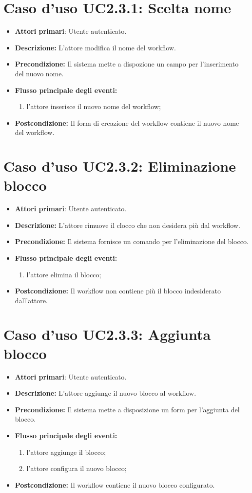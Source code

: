 {{{\section{Caso d'uso UC2.3.1: Scelta nome }
\begin{itemize}
	\item \textbf{Attori primari}: Utente autenticato.
	\item \textbf{Descrizione:} L'attore modifica il nome del workflow.
	\item \textbf{Precondizione:} Il sistema mette a dispozione un campo per l'inserimento del nuovo nome.
	\item \textbf{Flusso principale degli eventi:}
	\begin{enumerate}
		\item l'attore inserisce il nuovo nome del workflow;
	\end{enumerate}
	\item \textbf{Postcondizione:} Il form di creazione del workflow contiene il nuovo nome del workflow.
\end{itemize}
\section{Caso d'uso UC2.3.2: Eliminazione blocco }
\begin{itemize}
	\item \textbf{Attori primari}: Utente autenticato.
	\item \textbf{Descrizione:} L'attore rimuove il clocco che non desidera più dal workflow.
	\item \textbf{Precondizione:} Il sistema fornisce un comando per l'eliminazione del blocco.
	\item \textbf{Flusso principale degli eventi:}
	\begin{enumerate}
		\item l'attore elimina il blocco;
	\end{enumerate}
	\item \textbf{Postcondizione:} Il workflow non contiene più il blocco indesiderato dall'attore.
\end{itemize}
\section{Caso d'uso UC2.3.3: Aggiunta blocco }
\begin{itemize}
	\item \textbf{Attori primari}: Utente autenticato.
	\item \textbf{Descrizione:} L'attore aggiunge il nuovo blocco al workflow.
	\item \textbf{Precondizione:} Il sistema mette a disposizione un form per l'aggiunta del blocco.
	\item \textbf{Flusso principale degli eventi:}
	\begin{enumerate}
		\item l'attore aggiunge il blocco;
		\item l'attore configura il nuovo blocco;
	\end{enumerate}
	\item \textbf{Postcondizione:} Il workflow contiene il nuovo blocco configurato.
\end{itemize}
}}}
